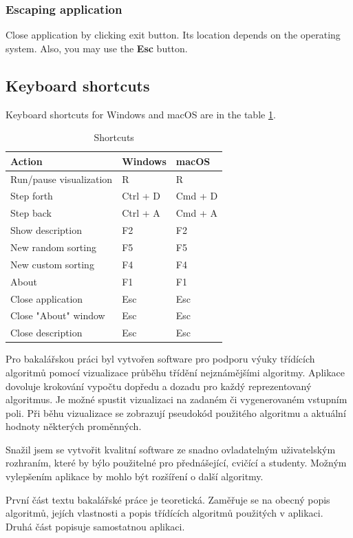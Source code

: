 \documentclass[
  field=inf,
  biblatex,
  language=english,
  glossaries,
  theorems=false,
  sourcecodes=false,
  index
]{kidiplom}
\begin{document}
\subsubsection{Escaping application}

Close application by clicking exit button. Its location depends on the operating system. Also, you may use the \textbf{Esc} button.

\subsection{Keyboard shortcuts}

Keyboard shortcuts for Windows and macOS are in the table \ref{tab:keyboard}.

\begin{table}[H]
	\centering
	\caption{Shortcuts}\label{tab:keyboard}
	\begin{tabular}{||l|l|l||}
	\hline
	\textbf{Action} & \textbf{Windows} & \textbf{macOS}\\
	\hline
	Run/pause visualization & R & R\\
	\hline
	Step forth & Ctrl + D & Cmd + D\\
	\hline
	Step back & Ctrl + A & Cmd + A\\
	\hline
	Show description & F2 & F2\\
	\hline
	New random sorting & F5 & F5\\
	\hline
	New custom sorting & F4 & F4\\
	\hline
	About & F1 & F1\\
	\hline
	Close application & Esc & Esc\\
	\hline
	Close "About" window & Esc & Esc\\
	\hline
	Close description & Esc & Esc\\
	\hline
	
	\end{tabular}
\end{table}

\begin{kiconclusions}[czech]
Pro bakalářskou práci byl vytvořen software pro podporu výuky třídících algoritmů pomocí vizualizace průběhu třídění nejznámějšími algoritmy. Aplikace dovoluje krokování vypočtu dopředu a dozadu pro každý reprezentovaný algoritmus. Je možné spustit vizualizaci na zadaném či vygenerovaném vstupním poli. Při běhu vizualizace se zobrazují pseudokód použitého algoritmu a aktuální hodnoty některých proměnných.

Snažil jsem se vytvořit kvalitní software ze snadno ovladatelným uživatelským rozhraním, které by býlo použitelné pro přednášející, cvičící a studenty. Možným vylepšením aplikace by mohlo být rozšíření o další algoritmy.

První část textu bakalářské práce je teoretická. Zaměřuje se na obecný popis algoritmů, jejích vlastnosti a popis třídících algoritmů použitých v aplikaci. Druhá část popisuje samostatnou aplikaci. 

\end{kiconclusions}
\end{document}
